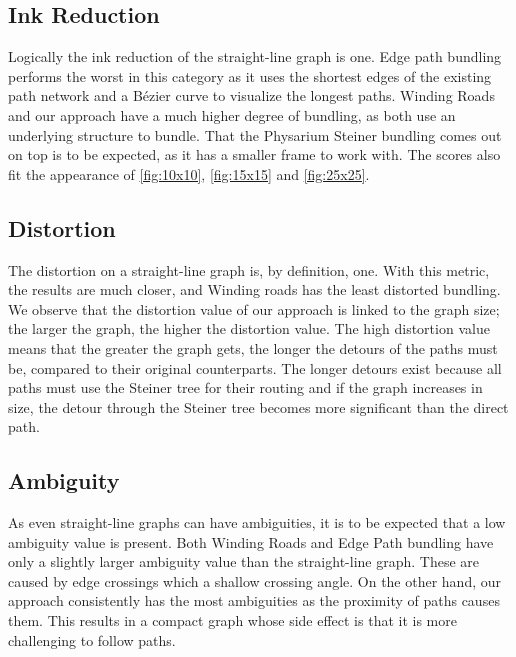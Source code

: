 \subsection{Ink Reduction}
\label{sec:ink_reduction}
Logically the ink reduction of the straight-line graph is one. Edge path bundling performs the worst in this category as it uses the shortest edges of the existing path network and a B\'{e}zier curve to visualize the longest paths. Winding Roads and our approach have a much higher degree of bundling, as both use an underlying structure to bundle. That the Physarium Steiner bundling comes out on top is to be expected, as it has a smaller frame to work with. The scores also fit the appearance of \autoref{fig:10x10}, \autoref{fig:15x15} and \autoref{fig:25x25}.

\subsection{Distortion}
\label{sec:distortion}
The distortion on a straight-line graph is, by definition, one. With this metric, the results are much closer, and Winding roads has the least distorted bundling. We observe that the distortion value of our approach is linked to the graph size; the larger the graph, the higher the distortion value. The high distortion value means that the greater the graph gets, the longer the detours of the paths must be, compared to their original counterparts. The longer detours exist because all paths must use the Steiner tree for their routing and if the graph increases in size, the detour through the Steiner tree becomes more significant than the direct path.

\subsection{Ambiguity}
\label{sec:ambiguity}
As even straight-line graphs can have ambiguities, it is to be expected that a low ambiguity value is present. Both Winding Roads and Edge Path bundling have only a slightly larger ambiguity value than the straight-line graph. These are caused by edge crossings which a shallow crossing angle. On the other hand, our approach consistently has the most ambiguities as the proximity of paths causes them. This results in a compact graph whose side effect is that it is more challenging to follow paths.

